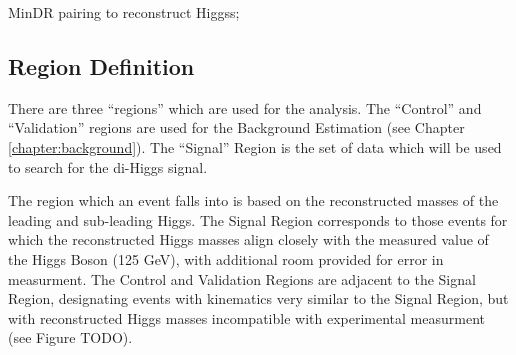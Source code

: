         MinDR pairing to reconstruct Higgss; %


    \subsection{Region Definition}
        
        There are three ``regions'' which are used for the analysis.
        The ``Control'' and ``Validation'' regions are used for the Background Estimation (see Chapter \ref{chapter:background}).
        The ``Signal'' Region is the set of data which will be used to search for the di-Higgs signal.

        The region which an event falls into is based on the reconstructed masses of the leading and sub-leading Higgs.
        The Signal Region corresponds to those events for which the reconstructed Higgs masses
            align closely with the measured value of the Higgs Boson (125 GeV), with additional room provided for error in measurment.
        The Control and Validation Regions are adjacent to the Signal Region,
            designating events with kinematics very similar to the Signal Region,
            but with reconstructed Higgs masses incompatible with experimental measurment (see Figure TODO).













%
